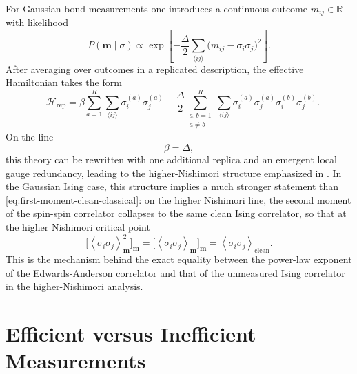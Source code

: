 \documentclass[11pt]{article}
\newcommand{\avg}[1]{\left\langle #1 \right\rangle}
\newcommand{\cH}{\mathcal H}
\begin{document}
For Gaussian bond measurements one introduces a continuous outcome $m_{ij}\in\mathbb{R}$ with likelihood
\begin{equation}
P(\bm m\mid \sigma)\propto
\exp\!\left[
-\frac{\Delta}{2}
\sum_{\langle ij\rangle}
\bigl(m_{ij}-\sigma_i\sigma_j\bigr)^2
\right].
\label{eq:gaussian-likelihood}
\end{equation}
After averaging over outcomes in a replicated description, the effective Hamiltonian takes the form
\begin{equation}
-\cH_{\mathrm{rep}}
=
\beta\sum_{a=1}^R\sum_{\langle ij\rangle}\sigma_i^{(a)}\sigma_j^{(a)}
+\frac{\Delta}{2}
\sum_{\substack{a,b=1\\ a\neq b}}^R
\sum_{\langle ij\rangle}
\sigma_i^{(a)}\sigma_j^{(a)}\sigma_i^{(b)}\sigma_j^{(b)}.
\label{eq:replica-hamiltonian}
\end{equation}
On the line
\begin{equation}
\beta=\Delta,
\label{eq:higher-nishimori-line}
\end{equation}
this theory can be rewritten with one additional replica and an emergent local gauge redundancy, leading to the higher-Nishimori structure emphasized in \cite{Patil2026}. In the Gaussian Ising case, this structure implies a much stronger statement than \eqref{eq:first-moment-clean-classical}: on the higher Nishimori line, the second moment of the spin-spin correlator collapses to the same clean Ising correlator, so that at the higher Nishimori critical point
\begin{equation}
\bigl[\avg{\sigma_i\sigma_j}_{\bm m}^2\bigr]_{\bm m}
=
\bigl[\avg{\sigma_i\sigma_j}_{\bm m}\bigr]_{\bm m}
=
\avg{\sigma_i\sigma_j}_{\mathrm{clean}}.
\label{eq:ea-clean}
\end{equation}
This is the mechanism behind the exact equality between the power-law exponent of the Edwards-Anderson correlator and that of the unmeasured Ising correlator in the higher-Nishimori analysis.

\section{Efficient versus Inefficient Measurements}
\end{document}
